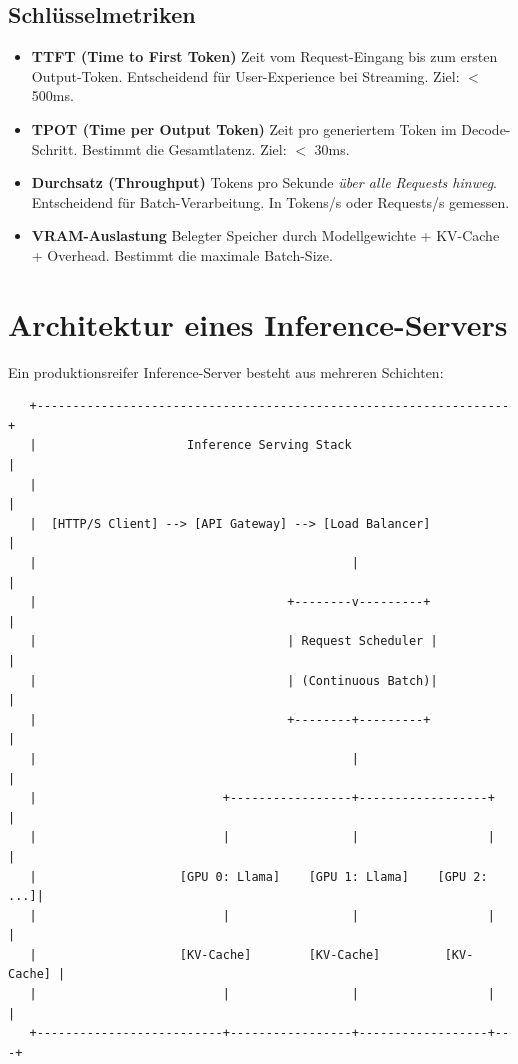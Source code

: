 \subsection{Schlüsselmetriken}

\begin{itemize}

    \item \textbf{TTFT (Time to First Token)} Zeit vom Request-Eingang bis zum ersten Output-Token. Entscheidend für User-Experience bei Streaming. Ziel: $<$ 500ms.
    \item \textbf{TPOT (Time per Output Token)} Zeit pro generiertem Token im Decode-Schritt. Bestimmt die Gesamtlatenz. Ziel: $<$ 30ms.
    \item \textbf{Durchsatz (Throughput)} Tokens pro Sekunde \textit{über alle Requests hinweg}. Entscheidend für Batch-Verarbeitung. In Tokens/s oder Requests/s gemessen.
    \item \textbf{VRAM-Auslastung} Belegter Speicher durch Modellgewichte + KV-Cache + Overhead. Bestimmt die maximale Batch-Size.
\end{itemize}


\section{Architektur eines Inference-Servers}

Ein produktionsreifer Inference-Server besteht aus mehreren Schichten:

\begin{verbatim}
   +------------------------------------------------------------------+
   |                     Inference Serving Stack                       |
   |                                                                   |
   |  [HTTP/S Client] --> [API Gateway] --> [Load Balancer]            |
   |                                            |                      |
   |                                   +--------v---------+            |
   |                                   | Request Scheduler |            |
   |                                   | (Continuous Batch)|            |
   |                                   +--------+---------+            |
   |                                            |                      |
   |                          +-----------------+------------------+   |
   |                          |                 |                  |   |
   |                    [GPU 0: Llama]    [GPU 1: Llama]    [GPU 2: ...]|
   |                          |                 |                  |   |
   |                    [KV-Cache]        [KV-Cache]         [KV-Cache] |
   |                          |                 |                  |   |
   +--------------------------+-----------------+------------------+---+
\end{verbatim}

